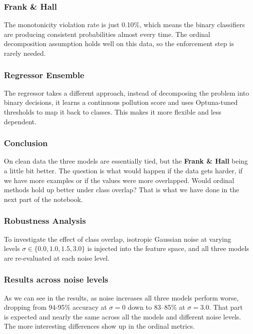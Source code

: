 \documentclass[a4paper,12pt]{article}
\begin{document}
	\subsubsection{Frank \& Hall}
	
	The monotonicity violation rate is just 0.10\%, which means the binary classifiers are producing consistent probabilities almost every time. The ordinal decomposition assumption holds well on this data, so the enforcement step is rarely needed.
	
	\subsubsection{Regressor Ensemble}
	
	The regressor takes a different approach, instead of decomposing the problem into binary decisions, it learns a continuous pollution score and uses Optuna-tuned thresholds to map it back to classes. This makes it more flexible and less dependent.
	
	\subsubsection{Conclusion}
	
	On clean data the three models are essentially tied, but the \textbf{Frank \& Hall} being a little bit better. The question is what would happen if the data gets harder, if we have more examples or if the values were more overlapped. Would ordinal methods hold up better under class overlap? That is what we have done in the next part of the notebook.
	
	
	\subsubsection{Robustness Analysis}
	
	To investigate the effect of class overlap, isotropic Gaussian noise at varying levels
	$\sigma \in \{0.0, 1.0, 1.5, 3.0\}$ is injected into the feature space, and all three
	models are re-evaluated at each noise level.
	
	\subsubsection{Results across noise levels}
	
	As we can see in the results, as noise increases all three models perform worse, dropping from 94-95\% accuracy at $\sigma = 0$
	down to 83--85\% at $\sigma = 3.0$. That part is expected and nearly the same across all the models and different noise levels. The more interesting differences show up in the ordinal metrics.
	
\end{document}
